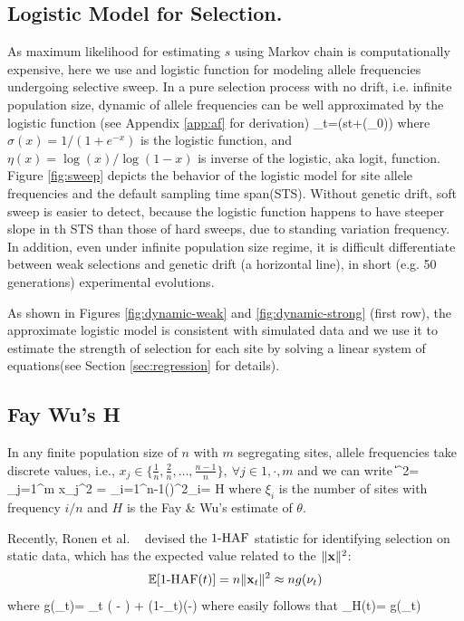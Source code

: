 \documentclass[11pt]{article}
\begin{document}
\subsection{Logistic Model for Selection.}
As maximum likelihood for estimating $s$ using Markov chain is computationally 
expensive, here we use and logistic function for modeling allele frequencies 
undergoing selective sweep.
In a pure selection process with no drift, i.e. infinite 
population size, 
dynamic of allele frequencies 
can be well approximated by the logistic function (see 
Appendix \ref{app:af} 
for 
derivation)
\beq
\nu_t=\sigma(st+\eta(\nu_0))\label{eq:nut}
\eeq
where $\sigma(x)=1/(1+e^{-x})$ is the logistic function, and 
$\eta(x)=\log(x)/\log(1-x)$ is inverse of the 
logistic, aka logit, function. Figure \ref{fig:sweep} depicts 
the behavior of 
the logistic model for site allele frequencies and the 
default sampling time 
span(STS). Without genetic drift, soft sweep is easier to 
detect, 
because the logistic function happens to have steeper slope 
in th STS than 
those of hard sweeps, due to standing variation frequency. In addition, even 
under infinite 
population size regime, it is 
difficult differentiate between weak selections and genetic 
drift (a horizontal 
line), in short (e.g. 50 generations) experimental evolutions.


As shown in Figures \ref{fig:dynamic-weak} and \ref{fig:dynamic-strong} (first 
row), the approximate logistic model is consistent with 
simulated data and we 
use it to estimate the strength of selection for 
each site by solving a linear system of equations(see Section 
\ref{sec:regression} for details).

\subsection{Fay Wu's H}\label{app:h}
In any finite population size of $n$ with $m$ segregating sites, 
allele frequencies take 
discrete values, i.e.,  $x_j \in 
\{\frac{1}{n},\frac{2}{n},\ldots,\frac{n-1}{n}\}, \ \forall j \in{1,\cdot,m}$ 
and we can write
\beq
\|\bfx\|^2= \sum_{j=1}^{m} x_j^2 = 
\sum_{i=1}^{n-1}\left(\right)^2\xi_i= 
H 
\eeq
where $\xi_i$ is the number of sites with frequency $i/n$ and $H$ is the 
Fay \& Wu's estimate of $\theta$.

Recently, Ronen et al. ~\cite{ronen2015predicting} devised the $1\text{-HAF}$ 
statistic for identifying selection on static data, which has the expected 
value related to the $\|{\mathbf x}\|^2$:
\begin{equation} 
{\mathbb E}[1\text{-HAF}(t)]= n\| {\mathbf x}_t\|^2\approx ng(\nu_t)
\end{equation} 
where
\beq
g(\nu_t)= \theta \nu_t \left( - \right) +
\theta (1-\nu_t)\left(-\right)
\label{eq:hafscorepooled}
\eeq
where easily follows that
\beq
\theta_H(t)= g(\nu_t)
\eeq
\end{document}
